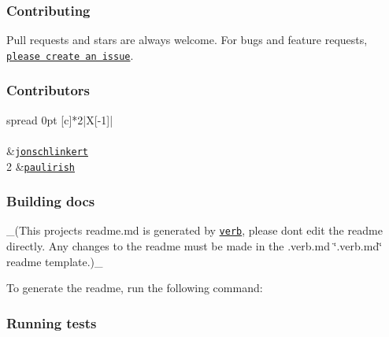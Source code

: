 \subsubsection*{Contributing}

Pull requests and stars are always welcome. For bugs and feature requests, \href{../../issues/new}{\tt please create an issue}.

\subsubsection*{Contributors}

\tabulinesep=1mm
\begin{longtabu} spread 0pt [c]{*{2}{|X[-1]}|}
\hline
\rowcolor{\tableheadbgcolor}\\
\endfirsthead
\hline
\endfoot
\hline
\rowcolor{\tableheadbgcolor}\\
  &\href{https://github.com/jonschlinkert}{\tt jonschlinkert}   \\
2  &\href{https://github.com/paulirish}{\tt paulirish}   \\
\end{longtabu}


\subsubsection*{Building docs}

\+\_\+(This project\textquotesingle{}s readme.\+md is generated by \href{https://github.com/verbose/verb-generate-readme}{\tt verb}, please don\textquotesingle{}t edit the readme directly. Any changes to the readme must be made in the .verb.\+md \char`\"{}.\+verb.\+md\char`\"{} readme template.)\+\_\+

To generate the readme, run the following command\+:




\subsubsection*{Running tests}

